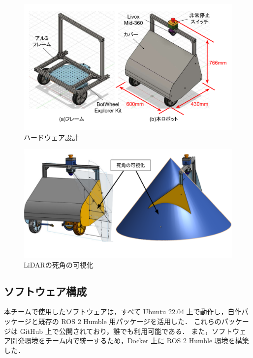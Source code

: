 \documentclass[twocolumn,9pt]{jsproceedings}
\begin{document}
\begin{figure}[h]
  \begin{center}
    \includegraphics[width=1.0\linewidth]{figs/robot_flame.pdf}
    \caption{ハードウェア設計}
    \label{fig:trainee_flame}
  \end{center}
\end{figure}

\begin{figure}[h]
  \begin{center}
    \includegraphics[width=1.0\linewidth]{figs/lidar_position_onshape.pdf}
    \caption{LiDARの死角の可視化}
    \label{fig:lidar_pos}
  \end{center}
\end{figure}

\subsection{ソフトウェア構成}\label{sub:software}

本チームで使用したソフトウェアは，すべて Ubuntu 22.04 上で動作し，自作パッケージと既存の ROS 2 Humble 用パッケージを活用した．
これらのパッケージは GitHub 上で公開されており，誰でも利用可能である．
また，ソフトウェア開発環境をチーム内で統一するため，Docker 上に ROS 2 Humble 環境を構築した．
\end{document}
